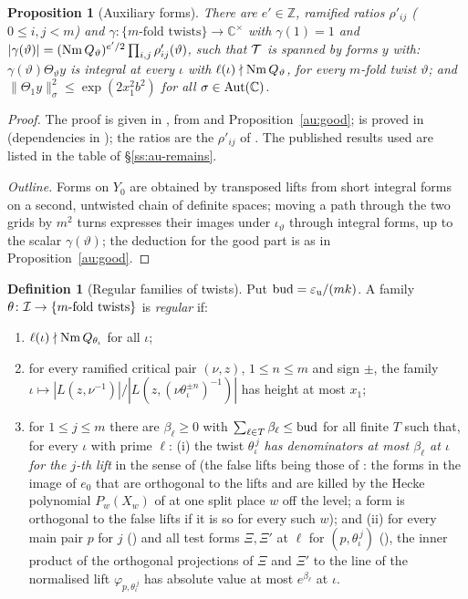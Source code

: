 \documentclass[10pt]{amsart}
\newtheorem{proposition}[theorem]{Proposition}
\theoremstyle{definition}
\newtheorem{definition}[theorem]{Definition}
\theoremstyle{remark}
\newcommand{\C}{\mathbb C}
\newcommand{\Z}{\mathbb Z}
\begin{document}
\begin{proposition}[Auxiliary forms]\label{au:aux}
There are $e'\in\Z$, ramified ratios $\rho'_{ij}$ ($0\le i,j<m$) and
$\gamma\colon\{m\text{-fold twists}\}\to\C^\times$ with $\gamma(1)=1$ and
$|\gamma(\vartheta)|=(\operatorname{Nm} Q_\vartheta)^{e'/2}\prod_{i,j}\rho'_{ij}(\vartheta)$, such that $\mathcal T$
is spanned by forms $y$ with: $\gamma(\vartheta)\Theta_\vartheta y$ is integral at every $\iota$
with $\ell(\iota)\nmid\operatorname{Nm} Q_\vartheta$, for every $m$-fold twist $\vartheta$; and
$\|\Theta_1y\|_\sigma^2\le\exp(2x_1^2b^2)$ for all $\sigma\in\auAut(\C)$.
\end{proposition}
\begin{proof}
The proof is given in {\cite[\S2.7]{P53}}, from {\cite[Theorem~2.28]{P53}} and Proposition~\ref{au:good}; {\cite[Theorem~2.28]{P53}} is proved in {\cite[\S\S5.1--8.3]{P53}} (dependencies in {\cite[\S5.1.6]{P53}}); the ratios are the $\rho'_{ij}$ of {\cite[(10)]{P53}}. The published results used are listed in the table of \S\ref{ss:au-remains}.

\emph{Outline.} Forms on $Y_0$ are obtained by transposed lifts from short integral forms on a second,
untwisted chain of definite spaces; moving a path through the two grids by $m^2$ turns expresses
their images under $\iota_\vartheta$ through integral forms, up to the scalar $\gamma(\vartheta)$;
the deduction for the good part is as in Proposition~\ref{au:good}.
\end{proof}

\begin{definition}[Regular families of twists]\label{def:au-regular}
Put $\mathrm{bud}=\varepsilon_{\mathrm u}/(mk)$. A family $\theta\colon\mathcal I\to\{m\text{-fold twists}\}$ is \emph{regular}
if:
\begin{enumerate}
\item[(R1)] $\ell(\iota)\nmid\operatorname{Nm} Q_{\theta_\iota}$ for all $\iota$;
\item[(R2)] for every ramified critical pair $(\nu,z)$, $1\le n\le m$ and sign $\pm$, the family
$\iota\mapsto|L(z,\nu^{-1})|/|L(z,(\nu\theta_\iota^{\pm n})^{-1})|$ has height at most $x_1$;
\item[(R3)] for $1\le j\le m$ there are $\beta_\ell\ge0$ with $\sum_{\ell\in T}\beta_\ell\le
\mathrm{bud}$ for all finite $T$ such that, for every $\iota$ with prime $\ell$: (i) the twist
$\theta_\iota^{\,j}$ \emph{has denominators at most $\beta_\ell$ at $\iota$ for the $j$-th lift}
in the sense of {\cite[Definition~2.8]{P54}} (the false lifts being those of
{\cite[Definition~2.6]{P54}}: the forms in the image of $e_0$ that are orthogonal to the lifts and
are killed by the Hecke polynomial $P_w(X_w)$ of {\cite[Lemma~2.2(L3)]{P54}} at one split place $w$
off the level; a form is orthogonal to the false lifts if it is so for every such $w$); and (ii)
for every main pair $p$ for $j$ ({\cite[Definition~2.19]{P54}}) and all test forms $\Xi,\Xi'$ at
$\ell$ for $(p,\theta_\iota^{\,j})$ ({\cite[Definition~2.22]{P54}}), the inner product of the orthogonal
projections of $\Xi$ and $\Xi'$ to the line of the normalised lift
$\varphi_{p,\theta_\iota^{\,j}}$ has absolute value at most $e^{\beta_\ell}$ at $\iota$.
\end{enumerate}
\end{definition}
\end{document}

